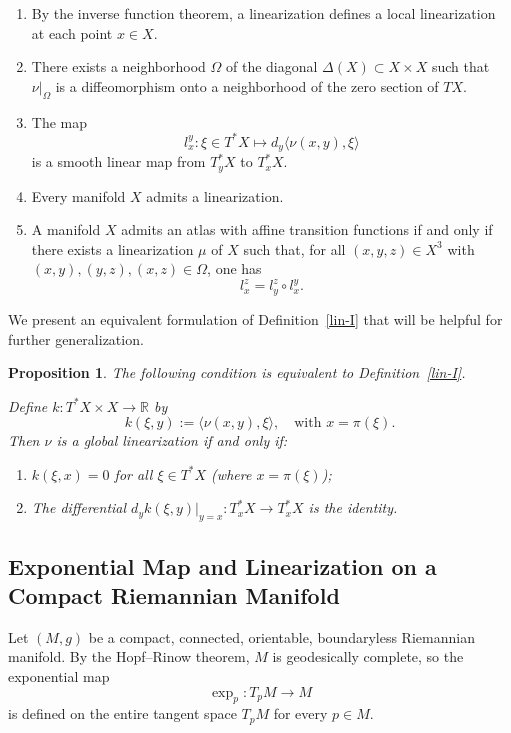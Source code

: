 \documentclass{amsart}
\def\R{\mathbb{R}}
\newcounter{thm}
\newcounter{ex}
\newcounter{re}
\newtheorem{Proposition}[thm]{Proposition}
\begin{document}
\begin{enumerate}
	\item By the inverse function theorem, a linearization defines a local linearization at each point $x \in X$.
	
	\item There exists a neighborhood $\Omega$ of the diagonal $\Delta(X) \subset X \times X$ such that $\nu|_\Omega$ is a diffeomorphism onto a neighborhood of the zero section of $TX$.
	
	\item The map
	\[
	l_x^y : \xi \in T^*X \mapsto d_y \langle \nu(x, y), \xi \rangle
	\]
	is a smooth linear map from $T^*_y X$ to $T^*_x X$.
	
	\item Every manifold $X$ admits a linearization.
	
	\item A manifold $X$ admits an atlas with affine transition functions if and only if there exists a linearization $\mu$ of $X$ such that, for all $(x,y,z) \in X^3$ with $(x,y), (y,z), (x,z) \in \Omega$, one has
	\[
	l_x^z = l_y^z \circ l_x^y.
	\]
\end{enumerate}

We present an equivalent formulation of Definition~\ref{lin-I} that will be helpful for further generalization.

\begin{Proposition}
	The following condition is equivalent to Definition~\ref{lin-I}.
	
	Define $k : T^*X \times X \to \R$ by
	\[
	k(\xi, y) := \langle \nu(x, y), \xi \rangle, \quad \text{with } x = \pi(\xi).
	\]
	Then $\nu$ is a global linearization if and only if:
	\begin{enumerate}
		\item $k(\xi, x) = 0$ for all $\xi \in T^*X$ (where $x = \pi(\xi)$);
		
		\item The differential $d_y k(\xi, y)|_{y = x} : T^*_x X \to T^*_x X$ is the identity.
	\end{enumerate}
\end{Proposition}

\subsection{Exponential Map and Linearization on a Compact Riemannian Manifold}

Let $(M, g)$ be a compact, connected, orientable, boundaryless Riemannian manifold. By the Hopf–Rinow theorem, $M$ is geodesically complete, so the exponential map
\[
\exp_p : T_p M \to M
\]
is defined on the entire tangent space $T_p M$ for every $p \in M$.
\end{document}
